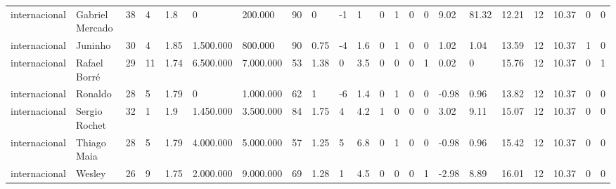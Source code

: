 \begin{longtable}{llllllllllllllllllllll}
internacional & Gabriel Mercado & 38 & 4 & 1.8 & 0 & 200.000 & 90 & 0 & -1 & 1 & 0 & 1 & 0 & 0 & 9.02 & 81.32 & 12.21 & 12 & 10.37 & 0 & 0 \\
internacional & Juninho & 30 & 4 & 1.85 & 1.500.000 & 800.000 & 90 & 0.75 & -4 & 1.6 & 0 & 1 & 0 & 0 & 1.02 & 1.04 & 13.59 & 12 & 10.37 & 1 & 0 \\
internacional & Rafael Borré & 29 & 11 & 1.74 & 6.500.000 & 7.000.000 & 53 & 1.38 & 0 & 3.5 & 0 & 0 & 0 & 1 & 0.02 & 0 & 15.76 & 12 & 10.37 & 0 & 1 \\
internacional & Ronaldo & 28 & 5 & 1.79 & 0 & 1.000.000 & 62 & 1 & -6 & 1.4 & 0 & 1 & 0 & 0 & -0.98 & 0.96 & 13.82 & 12 & 10.37 & 0 & 0 \\
internacional & Sergio Rochet & 32 & 1 & 1.9 & 1.450.000 & 3.500.000 & 84 & 1.75 & 4 & 4.2 & 1 & 0 & 0 & 0 & 3.02 & 9.11 & 15.07 & 12 & 10.37 & 0 & 0 \\
internacional & Thiago Maia & 28 & 5 & 1.79 & 4.000.000 & 5.000.000 & 57 & 1.25 & 5 & 6.8 & 0 & 1 & 0 & 0 & -0.98 & 0.96 & 15.42 & 12 & 10.37 & 0 & 0 \\
internacional & Wesley & 26 & 9 & 1.75 & 2.000.000 & 9.000.000 & 69 & 1.28 & 1 & 4.5 & 0 & 0 & 0 & 1 & -2.98 & 8.89 & 16.01 & 12 & 10.37 & 0 & 0 \\
\end{longtable}
